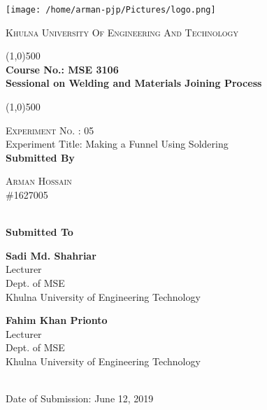 \documentclass[a4,12pt]{article}
\begin{document}
	
	
	\begin{titlepage}


		\centering
		\begin{minipage}{.25\textwidth}
			\centering
			\texttt{[image: /home/arman-pjp/Pictures/logo.png]}
		
		\end{minipage}%
		\begin{minipage}{0.35\textwidth}
			
		\textsc{\large Khulna University Of Engineering And Technology}
		\end{minipage}
	
	\begin{center}
		\line(1,0){500}\\
		[.1in]
		
		\textbf{\large{Course No.: MSE 3106}}\\
		[.1in]
		\textbf{\large{Sessional on Welding and Materials Joining Process}}
		
			\line(1,0){500}
		
	\end{center}

\begin{center}

\textsc{\large Experiment No. : 05}\\
[.1in]

\large Experiment Title: Making a Funnel Using Soldering \\
[2cm]
\textbf{Submitted By}\\
[.5cm]

\begin{minipage}{0.25\textwidth}
\textsc{\large  Arman Hossain\\ \#1627005}
\end{minipage}\\
[3cm]
\textbf{Submitted To}\\
[.5cm]

\begin{minipage}{0.6\textwidth}
	\textbf{\large  Sadi Md. Shahriar}\\
    \small{Lecturer\\
    Dept. of MSE\\
    Khulna University of Engineering Technology}
    
    
\end{minipage}%
\begin{minipage}{0.7\textwidth}
\textbf{\large  Fahim Khan Prionto}\\
\small{Lecturer\\
Dept. of MSE\\
Khulna University of Engineering Technology}
\end{minipage}\\
[2cm]


Date of Submission: June 12, 2019

\end{center}
	
		\end{titlepage}
		
\end{document}
